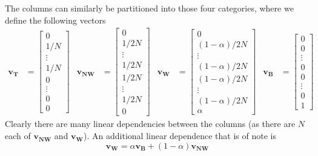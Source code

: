 \documentclass[11pt]{article}
\begin{document}
The columns can similarly be partitioned into those four categories, where we define the following vectors
\begin{align}
\mathbf{v_T}& = \left[\begin{array}{c}
0 \\ 1/N \\ \vdots \\ 1/N \\ 0 \\ \vdots \\ 0 \\ 0
\end{array}\right] & 
\mathbf{v_{NW}}& = \left[\begin{array}{c}
0 \\ 1/2N \\ \vdots \\ 1/2N \\ 1/2N \\ \vdots \\ 1/2N \\ 0
\end{array}\right] & 
\mathbf{v_W}& = \left[\begin{array}{c}
0 \\ (1-\alpha)/2N \\ \vdots \\ (1-\alpha)/2N \\ (1-\alpha)/2N \\ \vdots \\ (1-\alpha)/2N \\ \alpha
\end{array}\right] & 
\mathbf{v_B}& = \left[\begin{array}{c}
0 \\ 0 \\ \vdots \\ 0 \\ 0 \\ \vdots \\ 0 \\ 1
\end{array}\right] & 
\end{align}
Clearly there are many linear dependencies between the columns (as there are $N$ each of $\mathbf{v_{NW}}$ and $\mathbf{v_W}$). An additional linear dependence that is of note is
\begin{equation}
\mathbf{v_W} = \alpha\mathbf{v_B} + (1-\alpha)\mathbf{v_{NW}}
\end{equation}
\end{document}
